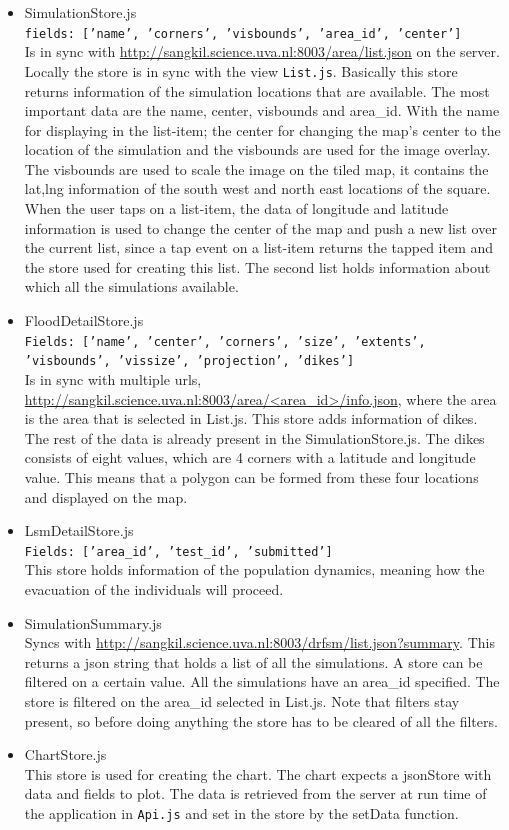 \begin{itemize}
\item SimulationStore.js \\
\texttt{fields: ['name', 'corners', 'visbounds', 'area\_id', 'center']} \\
Is in sync with \url{http://sangkil.science.uva.nl:8003/area/list.json} on the server. Locally the store is in sync with the view \texttt{List.js}. Basically this store returns information of the simulation locations that are available. The most important data are the name, center, visbounds and area\_id. With the name for displaying in the list-item; the center for changing the map's center to the location of the simulation and the visbounds are used for the image overlay. The visbounds are used to scale the image on the tiled map, it contains the lat,lng information of the south west and north east locations of the square. When the user taps on a list-item, the data of longitude and latitude information is used to change the center of the map and push a new list over the current list, since a tap event on a list-item returns the tapped item and the store used for creating this list. The second list holds information about which all the simulations available.
\item FloodDetailStore.js \\
\texttt{Fields: ['name', 'center', 'corners', 'size', 'extents', 'visbounds', 'vissize', 'projection', 'dikes']} \\
Is in sync with multiple urls, \url{http://sangkil.science.uva.nl:8003/area/<area\_id>/info.json}, where the area is the area that is selected in List.js. This store adds information of dikes. The rest of the data is already present in the SimulationStore.js. The dikes consists of eight values, which are 4 corners with a latitude and longitude value. This means that a polygon can be formed from these four locations and displayed on the map.
\item LsmDetailStore.js \\
\texttt{Fields: ['area\_id', 'test\_id', 'submitted']} \\
This store holds information of the population dynamics, meaning how the evacuation of the individuals will proceed. 
\item SimulationSummary.js \\
Syncs with \url{http://sangkil.science.uva.nl:8003/drfsm/list.json?summary}. This returns a json string that holds a list of all the simulations. A store can be filtered on a certain value. All the simulations have an area\_id specified. The store is filtered on the area\_id selected in List.js. Note that filters stay present, so before doing anything the store has to be cleared of all the filters.
\item ChartStore.js \\
This store is used for creating the chart. The chart expects a jsonStore with data and fields to plot. The data is retrieved from the server at run time of the application in \texttt{Api.js} and set in the store by the setData function.
\end{itemize}
